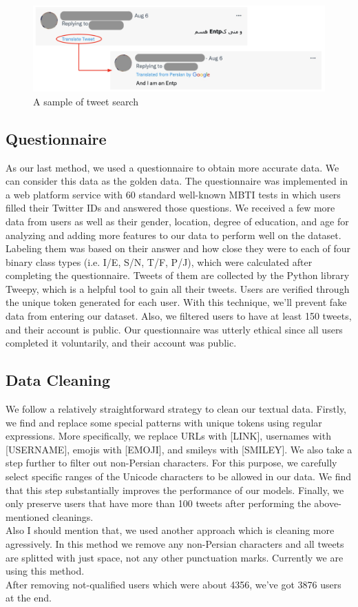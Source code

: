 \documentclass[10pt, a4paper]{article}
\begin{document}
\begin{figure}[h]
    \centering
    \includegraphics[width=.95\columnwidth]{images/sample-tweet.png}
    \caption{A sample of tweet search}
    \label{tweet_figure}
\end{figure}

\subsection{Questionnaire}
As our last method, we used a questionnaire to obtain more accurate data.
We can consider this data as the golden data.
The questionnaire was implemented in a web platform service with 60 standard well-known MBTI tests in which users
filled their Twitter IDs and answered those questions. We received a
few more data from users as well as their gender, location, degree of education,
and age for analyzing and adding more features to our data to perform well on the dataset.
Labeling them was based on their answer and how close they were to each of four binary class types (i.e. I/E, S/N, T/F, P/J),
which were calculated after completing the questionnaire.
Tweets of them are collected by the Python library Tweepy, which is a helpful tool to gain all their tweets.
Users are verified through the unique token generated for each user.
With this technique, we'll prevent fake data from entering our dataset.
Also, we filtered users to have at least 150 tweets, and their account is public.
Our questionnaire was utterly ethical since all users completed it voluntarily, and their account was public.

\subsection{Data Cleaning}
We follow a relatively straightforward strategy to clean our textual data.
Firstly, we find and replace some special patterns with unique tokens using regular expressions.
More specifically, we replace URLs with [LINK], usernames with [USERNAME], emojis with [EMOJI], and smileys with [SMILEY].
We also take a step further to filter out non-Persian characters.
For this purpose, we carefully select specific ranges of the Unicode characters to be allowed in our data.
We find that this step substantially improves the performance of our models.
Finally, we only preserve users that have more than 100 tweets after performing the above-mentioned cleanings.
\\
Also I should mention that, we used another approach which is cleaning more agressively. In this method we remove any non-Persian
characters and all tweets are splitted with just space, not any other punctuation marks. Currently we are using this method.
\\
After removing not-qualified users which were about 4356, we've got 3876 users at the end.
\end{document}
